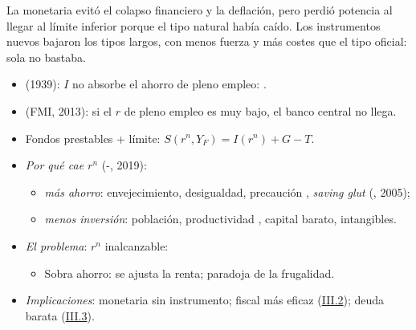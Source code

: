\documentclass{article}
\begin{document}
\begin{columnas}
\begin{ideaclave}
La monetaria evitó el colapso financiero y la deflación, pero perdió potencia al llegar al límite inferior porque el tipo natural había caído. Los instrumentos nuevos bajaron los tipos largos, con menos fuerza y más costes que el tipo oficial: sola no bastaba.
\end{ideaclave}

\begin{itemize}
\item {} (1939): $I$ no absorbe el ahorro de pleno empleo: .
\item {} (FMI, 2013): si el $r$ de pleno empleo es muy bajo, el banco central no llega.
\end{itemize}
\begin{itemize}
\item Fondos prestables  + límite:  $S(r^n,Y_F)=I(r^n)+G-T$.
\item \emph{Por qué cae $r^n$} (-, 2019):
  \begin{itemize}
  \item \emph{más ahorro}: envejecimiento, desigualdad, precaución , \emph{saving glut} (, 2005);
  \item \emph{menos inversión}: población, productividad , capital barato, intangibles.
  \end{itemize}
\item \emph{El problema}: $r^n$ inalcanzable:
  \begin{itemize}
  \item Sobra ahorro: se ajusta la renta; paradoja de la frugalidad.
  \end{itemize}
\end{itemize}
\begin{itemize}
\item \emph{Implicaciones}: monetaria sin instrumento; fiscal más eficaz (\hyperref[rep:III.2]{III.2}); deuda barata (\hyperref[rep:III.3]{III.3}).
\end{itemize}

\end{columnas}
\end{document}
